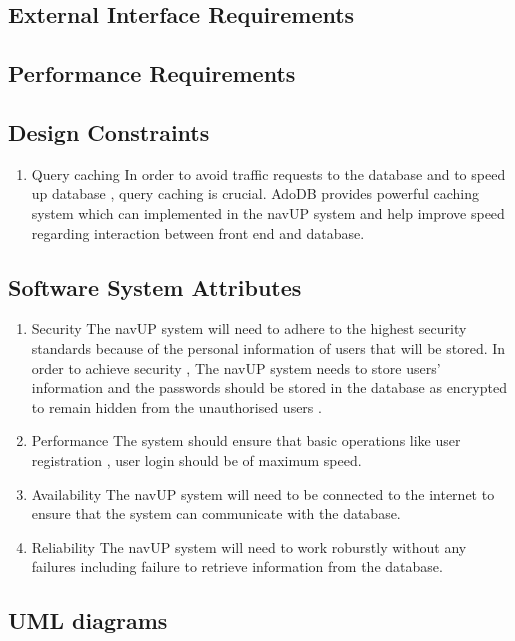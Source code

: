 \subsection{External Interface Requirements}
\subsection{Performance Requirements}
\subsection{Design Constraints}
\begin{enumerate}
	\item Query caching
	\newline
	In order to avoid traffic requests to the database and to speed up database , query caching is crucial. AdoDB provides powerful caching system which can implemented in the navUP system and help improve speed regarding interaction between front end and database.
\end{enumerate}
\subsection{Software System Attributes}
\begin{enumerate}
	\item Security
	\newline
	The navUP system will need to adhere to the highest security standards because of the personal information of users that will be stored. In order to achieve security , The navUP system needs to store users’ information and the passwords should be stored in the database as encrypted to remain hidden from the unauthorised users  .
	\item Performance
	\newline
	The system should ensure that basic operations like user registration , user login should be of maximum speed. 
	\item Availability
	\newline
	The navUP system will need to be connected to the internet to ensure that the system can communicate with  the database.
	\item Reliability
	\newline
	The navUP system will need to work roburstly without any failures including failure to retrieve information from the database.
\end{enumerate}
\subsection{UML diagrams}
